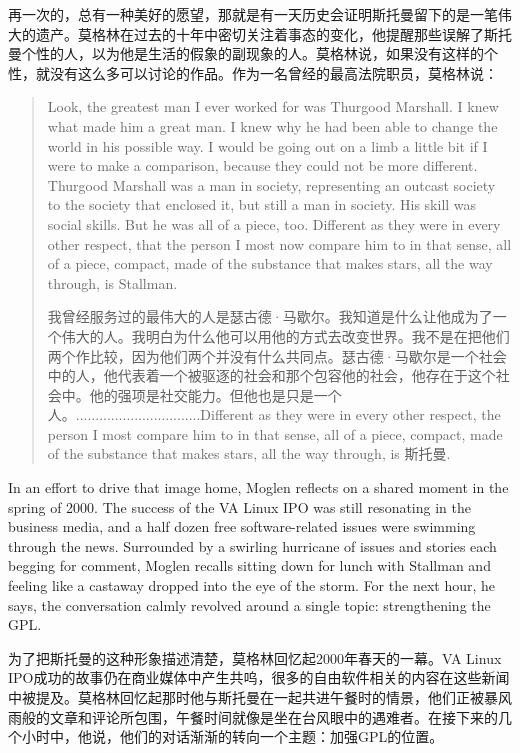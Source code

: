 \ifdefined\chs
再一次的，总有一种美好的愿望，那就是有一天历史会证明斯托曼留下的是一笔伟大的遗产。莫格林在过去的十年中密切关注着事态的变化，他提醒那些误解了斯托曼个性的人，以为他是生活的假象的副现象的人。莫格林说，如果没有这样的个性，就没有这么多可以讨论的作品。作为一名曾经的最高法院职员，莫格林说：
\fi

\begin{quote}
\ifdefined\eng
Look, the greatest man I ever worked for was Thurgood Marshall. I knew what made him a great man. I knew why he had been able to change the world in his possible way. I would be going out on a limb a little bit if I were to make a comparison, because they could not be more different. Thurgood Marshall was a man in society, representing an outcast society to the society that enclosed it, but still a man in society. His skill was social skills. But he was all of a piece, too. Different as they were in every other respect, that the person I most now compare him to in that sense, all of a piece, compact, made of the substance that makes stars, all the way through, is Stallman.
\fi

\ifdefined\chs
我曾经服务过的最伟大的人是瑟古德·马歇尔。我知道是什么让他成为了一个伟大的人。我明白为什么他可以用他的方式去改变世界。我不是在把他们两个作比较，因为他们两个并没有什么共同点。瑟古德·马歇尔是一个社会中的人，他代表着一个被驱逐的社会和那个包容他的社会，他存在于这个社会中。他的强项是社交能力。但他也是只是一个人。................................Different as they were in every other respect, the person I most compare him to in that sense, all of a piece, compact, made of the substance that makes stars, all the way through, is 斯托曼.
\fi
\end{quote}

\ifdefined\eng
In an effort to drive that image home, Moglen reflects on a shared moment in the spring of 2000. The success of the VA Linux IPO was still resonating in the business media, and a half dozen free software-related issues were swimming through the news. Surrounded by a swirling hurricane of issues and stories each begging for comment, Moglen recalls sitting down for lunch with Stallman and feeling like a castaway dropped into the eye of the storm. For the next hour, he says, the conversation calmly revolved around a single topic: strengthening the GPL.
\fi

\ifdefined\chs
为了把斯托曼的这种形象描述清楚，莫格林回忆起2000年春天的一幕。VA Linux IPO成功的故事仍在商业媒体中产生共呜，很多的自由软件相关的内容在这些新闻中被提及。莫格林回忆起那时他与斯托曼在一起共进午餐时的情景，他们正被暴风雨般的文章和评论所包围，午餐时间就像是坐在台风眼中的遇难者。在接下来的几个小时中，他说，他们的对话渐渐的转向一个主题：加强GPL的位置。
\fi

